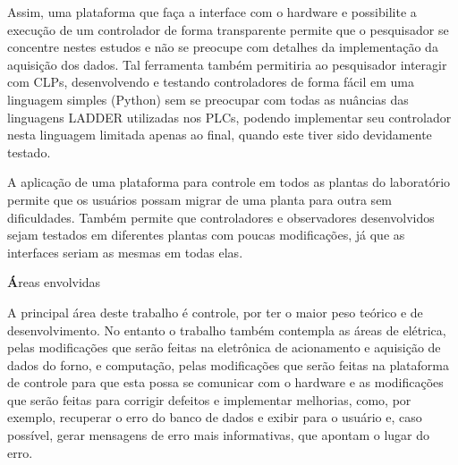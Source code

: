 Assim, uma plataforma que faça a interface com o hardware e possibilite a
execução de um controlador de forma transparente permite que o pesquisador se
concentre nestes estudos e não se preocupe com detalhes da implementação da
aquisição dos dados. Tal ferramenta também permitiria ao pesquisador
interagir com CLPs, desenvolvendo e testando controladores de forma fácil em
uma linguagem simples (Python) sem se preocupar com todas as nuâncias das
linguagens LADDER utilizadas nos PLCs, podendo implementar seu controlador nesta
linguagem limitada apenas ao final, quando este tiver sido devidamente testado.

A aplicação de uma plataforma para controle em todos as plantas do laboratório
permite que os usuários possam migrar de uma planta para outra sem dificuldades.
Também permite que controladores e observadores desenvolvidos sejam testados em
diferentes plantas com poucas modificações, já que as interfaces seriam as
mesmas em todas elas.

\noindent
{\textbf Áreas envolvidas}

A principal área deste trabalho é controle, por ter o maior peso teórico e de
desenvolvimento. No entanto o trabalho também contempla as áreas de elétrica,
pelas modificações que serão feitas na eletrônica de acionamento e aquisição de
dados do forno, e computação, pelas modificações que serão feitas na plataforma
de controle para que esta possa se comunicar com o hardware e as modificações
que serão feitas para corrigir defeitos e implementar melhorias, como, por
exemplo, recuperar o erro do banco de dados e exibir para o usuário e, caso
possível, gerar mensagens de erro mais informativas, que apontam o lugar do
erro.
